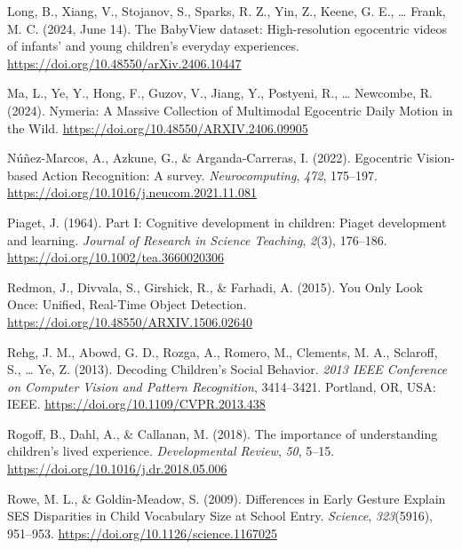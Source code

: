\documentclass[
  man,floatsintext]{apa6}
\newlength{\cslhangindent}
\newenvironment{CSLReferences}[2] %
 {\begin{list}{}{%
  \setlength{\itemindent}{0pt}
  \setlength{\leftmargin}{0pt}
  \setlength{\parsep}{0pt}
  \ifodd #1
   \setlength{\leftmargin}{\cslhangindent}
   \setlength{\itemindent}{-1\cslhangindent}
  \fi
  \setlength{\itemsep}{#2\baselineskip}}}
 {\end{list}}
\begin{document}
\begin{CSLReferences}{1}{0}
Long, B., Xiang, V., Stojanov, S., Sparks, R. Z., Yin, Z., Keene, G. E., \ldots{} Frank, M. C. (2024, June 14). The {BabyView} dataset: {High-resolution} egocentric videos of infants' and young children's everyday experiences. \url{https://doi.org/10.48550/arXiv.2406.10447}

Ma, L., Ye, Y., Hong, F., Guzov, V., Jiang, Y., Postyeni, R., \ldots{} Newcombe, R. (2024). Nymeria: {A Massive Collection} of {Multimodal Egocentric Daily Motion} in the {Wild}. \url{https://doi.org/10.48550/ARXIV.2406.09905}

Núñez-Marcos, A., Azkune, G., \& Arganda-Carreras, I. (2022). Egocentric {Vision-based Action Recognition}: {A} survey. \emph{Neurocomputing}, \emph{472}, 175--197. \url{https://doi.org/10.1016/j.neucom.2021.11.081}

Piaget, J. (1964). Part {I}: {Cognitive} development in children: {Piaget} development and learning. \emph{Journal of Research in Science Teaching}, \emph{2}(3), 176--186. \url{https://doi.org/10.1002/tea.3660020306}

Redmon, J., Divvala, S., Girshick, R., \& Farhadi, A. (2015). You {Only Look Once}: {Unified}, {Real-Time Object Detection}. \url{https://doi.org/10.48550/ARXIV.1506.02640}

Rehg, J. M., Abowd, G. D., Rozga, A., Romero, M., Clements, M. A., Sclaroff, S., \ldots{} Ye, Z. (2013). Decoding {Children}'s {Social Behavior}. \emph{2013 {IEEE Conference} on {Computer Vision} and {Pattern Recognition}}, 3414--3421. Portland, OR, USA: IEEE. \url{https://doi.org/10.1109/CVPR.2013.438}

Rogoff, B., Dahl, A., \& Callanan, M. (2018). The importance of understanding children's lived experience. \emph{Developmental Review}, \emph{50}, 5--15. \url{https://doi.org/10.1016/j.dr.2018.05.006}

Rowe, M. L., \& Goldin-Meadow, S. (2009). Differences in {Early Gesture Explain SES Disparities} in {Child Vocabulary Size} at {School Entry}. \emph{Science}, \emph{323}(5916), 951--953. \url{https://doi.org/10.1126/science.1167025}


\end{CSLReferences}
\end{document}
